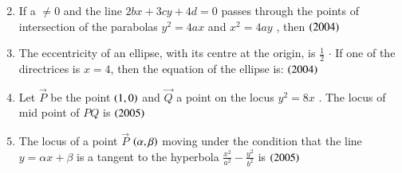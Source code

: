 \documentclass[journal,12pt,twocolumn]{IEEEtran}
\theoremstyle{remark}
\begin{document}
\begin{enumerate}
\begin{enumerate}
\begin{multicols}{2}
\end{multicols}
\end{enumerate}
\hfill
\item If a $ \neq 0 $ and the line {$ 2bx +3cy + 4d = 0 $} passes through the points of intersection of the parabolas {$ y^2 = 4ax $} and {$  x^2 = 4ay $} , then 
\hfill
\hfill{{$\left(2004\right) $}}
\begin{enumerate}
\end{enumerate}
\hfill
\item The eccentricity of an ellipse, with its centre at the origin, is {$ \frac{1}{2} $} {$ \cdot $} If one of the directrices is {$ x = 4 $}, then the equation of the ellipse is: \hfill{{$ \left(2004\right) $}}
\begin{enumerate}
\end{enumerate}
\hfill 
\item Let {$\vec{P}$} be the point {$ \left(1,0\right) $} and {$\vec{Q}$} a point on the locus {$ y^2 = 8x $} . The locus of mid point of {$ PQ $} is \hfill{{$ \left(2005\right) $}}
\begin{enumerate}
\end{enumerate}
\hfill
\item The locus of a point {$\vec{P}$} {$ \left(\alpha,\beta\right) $} moving under the condition that the line {$ y = \alpha x + \beta $} is a tangent to the hyperbola {$ \frac{x^2}{a^2} - \frac{y^2}{b^2} $} is \hfill{{$ \left(2005\right) $}}

\end{enumerate}
\end{document}
